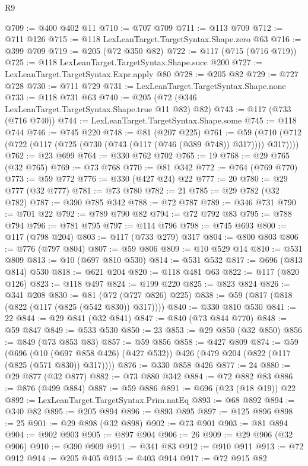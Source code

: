 \begin{lexlean}{R9}
\begin{coremodule}
@709 := @400 @402 @11
@710 := @707 @709
@711 := @113 @709
@712 := @711 @126
@715 := @118 LexLeanTarget.TargetSyntax.Shape.zero @63
@716 := @399 @709
@719 := @205 (@72 @350 @82)
@722 := @117 (@715 (@716 @719))
@725 := @118 LexLeanTarget.TargetSyntax.Shape.succ @200
@727 := LexLeanTarget.TargetSyntax.Expr.apply @80
@728 := @205 @82
@729 := @727 @728
@730 := @711 @729
@731 := LexLeanTarget.TargetSyntax.Shape.none
@733 := @118 @731 @63
@740 := @205 (@72 (@346 LexLeanTarget.TargetSyntax.Shape.true @11 @82) @82)
@743 := @117 (@733 (@716 @740))
@744 := LexLeanTarget.TargetSyntax.Shape.some
@745 := @118 @744
@746 := @745 @220
@748 := @81 (@207 @225)
@761 := @59 (@710 (@712 (@722 (@117 (@725 (@730 (@743 (@117 (@746 (@389 @748)) @317)))) @317))))
@762 := @23 @699
@764 := @330 @762 @702
@765 := 19
@768 := @29 @765 (@32 @765)
@769 := @73 @768
@770 := @81 @342
@772 := @764 (@769 @770)
@773 := @59 @772
@776 := @330 (@427 @24) @22
@777 := 20
@780 := @29 @777 (@32 @777)
@781 := @73 @780
@782 := 21
@785 := @29 @782 (@32 @782)
@787 := @390 @785 @342
@788 := @72 @787
@789 := @346 @731
@790 := @701 @22
@792 := @789 @790 @82
@794 := @72 @792 @83
@795 := @788 @794
@796 := @781 @795
@797 := @114 @796
@798 := @745 @693
@800 := @117 (@798 @204)
@803 := @117 (@733 @279) @317
@804 := @800 @803
@806 := @776 (@797 @804)
@807 := @59 @806
@809 := @10 @529 @14
@810 := @531 @809
@813 := @10 (@697 @810 @530)
@814 := @531 @532
@817 := @696 (@813 @814) @530
@818 := @621 @204
@820 := @118 @481 @63
@822 := @117 (@820 @126)
@823 := @118 @497
@824 := @199 @220
@825 := @823 @824
@826 := @341 @208
@830 := @81 (@72 (@727 @826) @225)
@838 := @59 (@817 (@818 (@822 (@117 (@825 (@542 @830)) @317))))
@840 := @330 @810 @530
@841 := 22
@844 := @29 @841 (@32 @841)
@847 := @840 (@73 @844 @770)
@848 := @59 @847
@849 := @533 @530
@850 := 23
@853 := @29 @850 (@32 @850)
@856 := @849 (@73 @853 @83)
@857 := @59 @856
@858 := @427 @809
@874 := @59
    (@696 (@10 (@697 @858 @426) (@427 @532)) @426 (@479 @204 (@822 (@117 (@825 (@571 @830)) @317))))
@876 := @330 @858 @426
@877 := 24
@880 := @29 @877 (@32 @877)
@882 := @73 @880 @342
@884 := @72 @882 @83
@886 := @876 (@499 @884)
@887 := @59 @886
@891 := @696 (@23 (@18 @19)) @22
@892 := LexLeanTarget.TargetSyntax.Prim.natEq
@893 := @68 @892
@894 := @340 @82
@895 := @205 @894
@896 := @893 @895
@897 := @125 @896
@898 := 25
@901 := @29 @898 (@32 @898)
@902 := @73 @901
@903 := @81 @894
@904 := @902 @903
@905 := @897 @904
@906 := 26
@909 := @29 @906 (@32 @906)
@910 := @390 @909
@911 := @341 @83
@912 := @910 @911
@913 := @72 @912
@914 := @205 @405
@915 := @403 @914
@917 := @72 @915 @82

\end{coremodule}
\end{lexlean}
